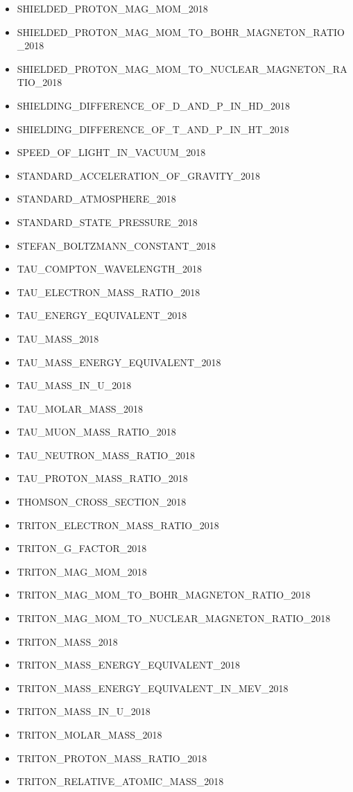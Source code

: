 \begin{itemize}
\item SHIELDED\_PROTON\_MAG\_MOM\_2018
\item SHIELDED\_PROTON\_MAG\_MOM\_TO\_BOHR\_MAGNETON\_RATIO\_2018
\item SHIELDED\_PROTON\_MAG\_MOM\_TO\_NUCLEAR\_MAGNETON\_RATIO\_2018
\item SHIELDING\_DIFFERENCE\_OF\_D\_AND\_P\_IN\_HD\_2018
\item SHIELDING\_DIFFERENCE\_OF\_T\_AND\_P\_IN\_HT\_2018
\item SPEED\_OF\_LIGHT\_IN\_VACUUM\_2018
\item STANDARD\_ACCELERATION\_OF\_GRAVITY\_2018
\item STANDARD\_ATMOSPHERE\_2018
\item STANDARD\_STATE\_PRESSURE\_2018
\item STEFAN\_BOLTZMANN\_CONSTANT\_2018
\item TAU\_COMPTON\_WAVELENGTH\_2018
\item TAU\_ELECTRON\_MASS\_RATIO\_2018
\item TAU\_ENERGY\_EQUIVALENT\_2018
\item TAU\_MASS\_2018
\item TAU\_MASS\_ENERGY\_EQUIVALENT\_2018
\item TAU\_MASS\_IN\_U\_2018
\item TAU\_MOLAR\_MASS\_2018
\item TAU\_MUON\_MASS\_RATIO\_2018
\item TAU\_NEUTRON\_MASS\_RATIO\_2018
\item TAU\_PROTON\_MASS\_RATIO\_2018
\item THOMSON\_CROSS\_SECTION\_2018
\item TRITON\_ELECTRON\_MASS\_RATIO\_2018
\item TRITON\_G\_FACTOR\_2018
\item TRITON\_MAG\_MOM\_2018
\item TRITON\_MAG\_MOM\_TO\_BOHR\_MAGNETON\_RATIO\_2018
\item TRITON\_MAG\_MOM\_TO\_NUCLEAR\_MAGNETON\_RATIO\_2018
\item TRITON\_MASS\_2018
\item TRITON\_MASS\_ENERGY\_EQUIVALENT\_2018
\item TRITON\_MASS\_ENERGY\_EQUIVALENT\_IN\_MEV\_2018
\item TRITON\_MASS\_IN\_U\_2018
\item TRITON\_MOLAR\_MASS\_2018
\item TRITON\_PROTON\_MASS\_RATIO\_2018
\item TRITON\_RELATIVE\_ATOMIC\_MASS\_2018

\end{itemize}
